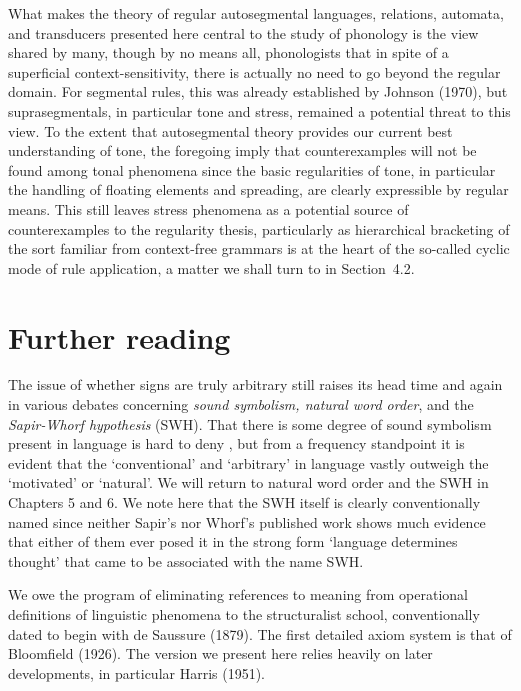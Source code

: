 \bigskip\noindent
What makes the theory of regular autosegmental languages, relations, automata,
and transducers presented here central to the study of phonology is the view
shared by many, though by no means all, phonologists that in spite of a
superficial context-sensitivity, there is actually no need to go beyond the
regular domain. For segmental rules, this was already established by Johnson
(1970), but suprasegmentals, in particular tone and stress, remained a
potential threat to this view. To the extent that autosegmental theory
provides our current best understanding of tone, the foregoing imply that
counterexamples will not be found among tonal phenomena since the basic
regularities of tone, in particular the handling of floating elements and
spreading, are clearly expressible by regular means. This still leaves stress
phenomena as a potential source of counterexamples to the regularity thesis,
particularly as hierarchical bracketing of the sort familiar from context-free
grammars is at the heart of the so-called cyclic mode of rule application, a
matter we shall turn to in Section~4.2. 


\section{Further reading}

The issue of whether signs are truly arbitrary still raises its head time and
again in various debates concerning {\it sound symbolism, natural word order},
and the {\it Sapir-Whorf hypothesis} (SWH). That there is some degree of sound
symbolism present in language is hard to deny \cite{Allott:1995}, but from a
frequency standpoint it is evident that the `conventional' and `arbitrary' in
language vastly outweigh the `motivated' or `natural'. We will return to
natural word order and the SWH in Chapters 5 and 6. We note here that the SWH
itself is clearly conventionally named since neither Sapir's nor Whorf's
published work shows much evidence that either of them ever posed it in
the strong form `language determines thought' that came to be associated with
the name SWH.  

We owe the program of eliminating references to meaning from operational
definitions of linguistic phenomena to the structuralist school,
conventionally dated to begin with de Saussure (1879). The first detailed
axiom system is that of Bloomfield (1926). The version we present here relies
heavily on later developments, in particular Harris (1951).
\nocite{Bloomfield:1926}\nocite{Saussure:1879}\nocite{Harris:1951}

